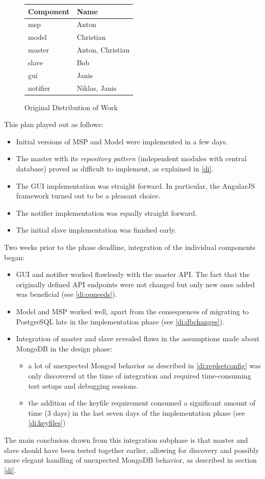\begin{figure}[h]
\centering
\begin{tabular}{l|l}
        Component & Name\\
        \hline
        msp       & Anton\\
        model     & Christian\\
        master    & Anton, Christian\\
        slave     & Bob\\
        gui       & Janis\\
        notifier  & Niklas, Janis\\
\end{tabular}
\caption{Original Distribution of Work}
\end{figure}

This plan played out as follows:

\begin{itemize}
\item Initial versions of MSP and Model were implemented in a few days.
\item The master with its \textit{repository pattern} (independent modules with central database) proved as difficult to implement, as
      explained in \ref{di}.
\item The GUI implementation was straight forward. In particular, the AngularJS framework turned out to be a pleasant choice.
\item The notifier implementation was equally straight forward.
\item The initial slave implementation was finished early.
\end{itemize}

Two weeks prior to the phase deadline, integration of the individual components began:

\begin{itemize}
\item GUI and notifier worked flawlessly with the master API. The fact that the originally defined API endpoints were not changed
                but only new ones added was beneficial (see \ref{di:opneeds}).
\item Model and MSP worked well, apart from the consequences of migrating to PostgreSQL late in the implementation phase
        (see \ref{di:dbchanges}).
\item Integration of master and slave revealed flaws in the assumptions made about MongoDB in the design phase:
        \begin{itemize}
                \item a lot of unexpected Mongod behavior as described in \ref{di:replsetconfig} was only discovered at the
                        time of integration and required time-consuming test setups and debugging sessions.
                \item the addition of the keyfile requirement consumed a significant amount of time (3 days) in the
                       last seven days of the implementation phase (see \ref{di:keyfiles})
        \end{itemize}
\end{itemize}

The main conclusion drawn from this integration subphase is that master and slave should have been tested together earlier, allowing for
discovery and possibly more elegant handling of unexpected MongoDB behavior, as described in section \ref{di}.
